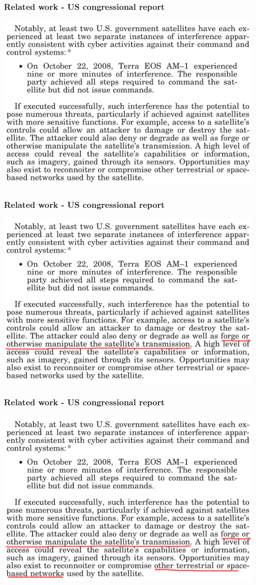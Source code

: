 \documentclass{beamer}
\begin{document}
\begin{frame}
  \frametitle{Related work - US congressional report}
    \includegraphics[width=\textwidth]{images/congress_report_3.png}
\end{frame}
\begin{frame}
  \frametitle{Related work - US congressional report}
    \includegraphics[width=\textwidth]{images/congress_report_4.png}
\end{frame}
\begin{frame}
  \frametitle{Related work - US congressional report}
    \includegraphics[width=\textwidth]{images/congress_report_5.png}
\end{frame}
\end{document}

